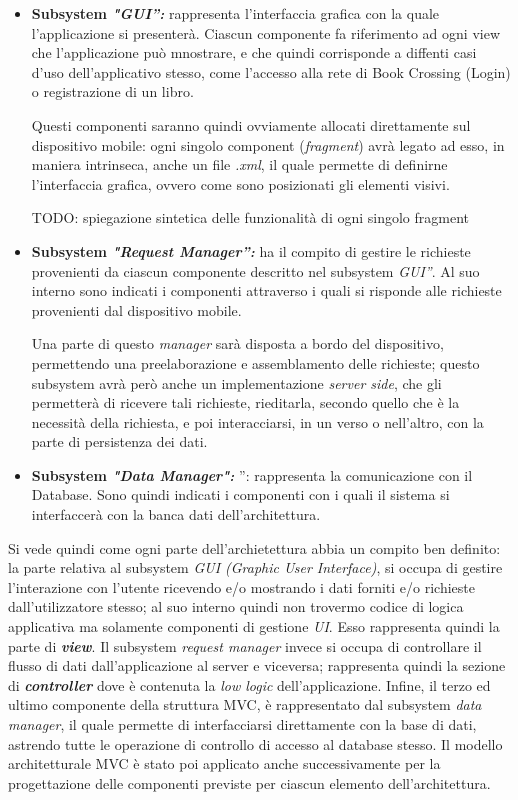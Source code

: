 \begin{itemize}
	\item\label{subsysGUI} \textbf{Subsystem \textit{"GUI”:}} rappresenta l’interfaccia grafica con la quale l’applicazione si presenterà. Ciascun componente fa riferimento ad ogni view che l'applicazione può mnostrare, e che quindi corrisponde a diffenti casi d'uso dell'applicativo stesso, come l’accesso alla rete di Book Crossing (Login) o registrazione di un  libro.
	
	Questi componenti saranno quindi ovviamente allocati direttamente sul dispositivo mobile: ogni singolo component (\textit{fragment}) avrà legato ad esso, in maniera intrinseca, anche un file \textit{.xml}, il quale permette di definirne l'interfaccia grafica, ovvero come sono posizionati gli elementi visivi.
	
	TODO: spiegazione sintetica delle funzionalità di ogni singolo fragment
	
	\item\label{subsysRequestManager} \textbf{Subsystem \textit{"Request Manager”:}} ha il compito di gestire le richieste provenienti da ciascun componente descritto nel subsystem \textit{GUI”}. Al suo interno sono indicati i componenti attraverso i quali si risponde alle richieste provenienti dal dispositivo mobile.
	
	Una parte di questo \textit{manager} sarà disposta a bordo del dispositivo, permettendo una preelaborazione e assemblamento delle richieste; questo subsystem avrà però anche un implementazione \textit{server side}, che gli permetterà di ricevere tali richieste, rieditarla, secondo quello che è la necessità della richiesta, e poi interacciarsi, in un verso o nell'altro, con la parte di persistenza dei dati.
	\item\label{subsysDataManager} \textbf{Subsystem \textit{"Data Manager":}} ”: rappresenta la comunicazione con il Database. Sono quindi indicati i componenti con i quali il sistema si interfaccerà con la banca dati dell’architettura.
\end{itemize}

Si vede quindi come ogni parte dell'archietettura abbia un compito ben definito: la parte relativa al subsystem \textit{GUI (Graphic User Interface)}, si occupa di gestire l'interazione con l'utente ricevendo e/o mostrando i dati forniti e/o richieste dall'utilizzatore stesso; al suo interno quindi non trovermo codice di logica applicativa ma solamente componenti di gestione \textit{UI}. Esso rappresenta quindi la parte di \textit{\textbf{view}}.
Il subsystem \textit{request manager} invece si occupa di controllare il flusso di dati dall'applicazione al server e viceversa; rappresenta quindi la sezione di \textit{\textbf{controller}} dove è contenuta la \textit{low logic} dell'applicazione.
Infine, il terzo ed ultimo componente della struttura MVC, è rappresentato dal subsystem \textit{data manager}, il quale permette di interfacciarsi direttamente con la base di dati, astrendo tutte le operazione di controllo di accesso al database stesso.
Il modello architetturale MVC è stato poi applicato anche successivamente per la progettazione delle componenti previste per ciascun elemento dell'architettura.